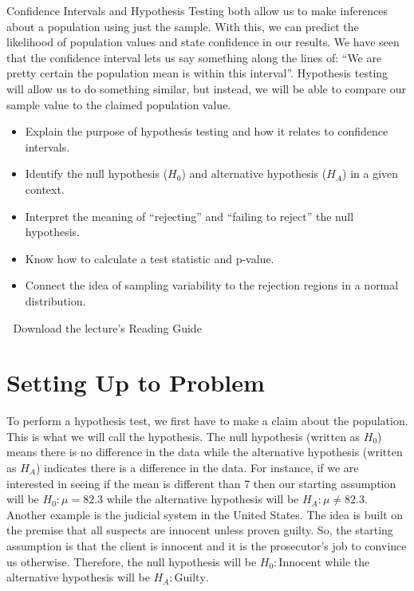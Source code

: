 \documentclass[
  letterpaper,
  DIV=11,
  numbers=noendperiod]{scrreprt}
\providecommand{\tightlist}{%
  \setlength{\itemsep}{0pt}\setlength{\parskip}{0pt}}
\begin{document}
Confidence Intervals and Hypothesis Testing both allow us to make
inferences about a population using just the sample. With this, we can
predict the likelihood of population values and state confidence in our
results. We have seen that the confidence interval lets us say something
along the lines of: ``We are pretty certain the population mean is
within this interval''. Hypothesis testing will allow us to do something
similar, but instead, we will be able to compare our sample value to the
claimed population value.

\begin{itemize}
\tightlist
\item
  Explain the purpose of hypothesis testing and how it relates to
  confidence intervals.
\item
  Identify the null hypothesis (\(H_0\)) and alternative hypothesis
  (\(H_A\)) in a given context.
\item
  Interpret the meaning of ``rejecting'' and ``failing to reject'' the
  null hypothesis.
\item
  Know how to calculate a test statistic and p-value.
\item
  Connect the idea of sampling variability to the rejection regions in a
  normal distribution.
\end{itemize}

\begin{tcolorbox}[enhanced jigsaw, leftrule=.75mm, arc=.35mm, coltitle=black, rightrule=.15mm, bottomrule=.15mm, toprule=.15mm, left=2mm, colbacktitle=quarto-callout-tip-color!10!white, title=\textcolor{quarto-callout-tip-color}{\faLightbulb}\hspace{0.5em}{Supplemental Material}, toptitle=1mm, breakable, colframe=quarto-callout-tip-color-frame, bottomtitle=1mm, titlerule=0mm, colback=white, opacityback=0, opacitybacktitle=0.6]

📄 Download the lecture's Reading Guide

\end{tcolorbox}

\section{Setting Up to Problem}\label{setting-up-to-problem}

To perform a hypothesis test, we first have to make a claim about the
population. This is what we will call the hypothesis. The null
hypothesis (written as \(H_0\)) means there is no difference in the data
while the alternative hypothesis (written as \(H_A\)) indicates there is
a difference in the data. For instance, if we are interested in seeing
if the mean is different than 7 then our starting assumption will be
\(H_0: \mu= 82.3\) while the alternative hypothesis will be
\(H_A: \mu \neq 82.3\). Another example is the judicial system in the
United States. The idea is built on the premise that all suspects are
innocent unless proven guilty. So, the starting assumption is that the
client is innocent and it is the prosecutor's job to convince us
otherwise. Therefore, the null hypothesis will be
\(H_0: \text{Innocent}\) while the alternative hypothesis will be
\(H_A: \text{Guilty}\).
\end{document}
